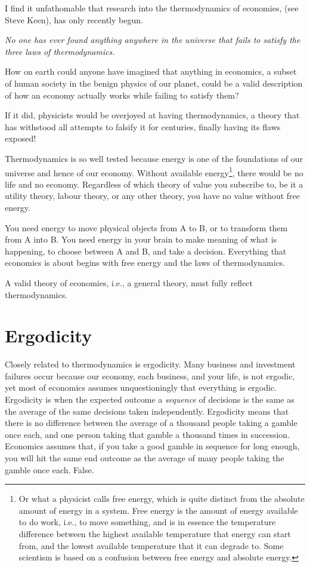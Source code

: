 I find it unfathomable that research into the thermodynamics of economies, (see Steve Keen\cite{keen-thermodynamic-economics}), has only recently begun.  


\emph{No one has ever found anything anywhere in the universe that fails to satisfy the three laws of thermodynamics.} 


How on earth could anyone have imagined that anything in economics, a subset of human society in the benign physics of our planet, could be a valid description of how an economy  actually works while failing to satisfy them? 


If it did, physicists  would be overjoyed at having thermodynamics, a theory that has withstood all attempts to falsify it for centuries, finally having its flaws exposed!


Thermodynamics  is so well tested because energy is one of the foundations of our universe and hence of our economy. Without available energy\footnote{Or what a physicist calls free energy, which is quite distinct from the absolute amount of energy in a system. Free energy is the amount of energy available to do work, i.e., to move something, and is in essence the temperature difference between the highest available temperature that energy can start from, and the lowest available temperature that it can degrade to. Some scientism is based on a confusion between free energy and absolute energy.}, there would be no life and no economy. Regardless of which theory of value you subscribe to, be it a utility theory, labour theory, or any other theory, you have no value without free energy.


You need energy to move physical objects from A to B, or to transform them from A into B. You need energy in your brain to make meaning of what is happening, to choose between A and B, and take a decision. Everything that economics is about begins with free energy and the laws of thermodynamics.  


A valid theory of economies, i.e., a general theory, must fully reflect thermodynamics.


\section{Ergodicity}
\label{section:ergodicity}
Closely related to thermodynamics is ergodicity. Many business and investment failures occur because our economy, each business, and your life, is not ergodic, yet most of economics assumes unquestioningly that everything is ergodic. Ergodicity is when the expected outcome a \emph{sequence} of decisions is the same as the average of the same decisions taken independently. Ergodicity means that there is no difference between the average of a thousand people taking a gamble once each, and one person taking that gamble a thousand times in succession. Economics assumes that, if you take a good gamble in sequence for long enough, you will hit the same end outcome as the average of many people taking the gamble once each. False.


